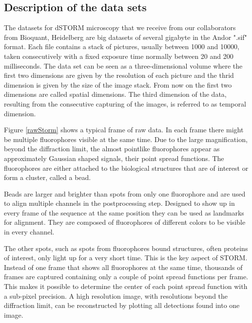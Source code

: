 \subsection{Description of the data sets}
The datasets for dSTORM microscopy that we receive from our collaborators from
Bioquant, Heidelberg are big datasets of several gigabyte in the Andor ".sif" format. Each
file contains a stack of pictures, usually between 1000 and 10000, taken
consecutively with a fixed exposure time normally between 20 and 200 milliseconds. The data set can be seen as a three-dimensional volume where the first two dimensions are given by the resolution of each picture and the thrid dimension is given by the size of the image stack. From now on the first two dimensions are called spatial dimensions. The third dimension of the data, resulting from the consecutive capturing of the images, is referred to as temporal dimension.\newline

Figure \ref{rawStorm} shows a typical frame of raw data. In each frame there might be multiple fluorophores visible at the same time. Due to the large magnification, beyond the diffraction limit, the almost pointlike fluorophores appear as approximately Gaussian shaped signals, their point spread functions. The fluorophores are either attached to the biological structures that are of interest or form a cluster, called a bead.\newline

Beads are larger and brighter than spots from only one fluorophore and are used to align multiple channels in the postprocessing step. Designed to show up in every frame of the sequence at the same position they can be used as landmarks for alignment. They are composed of fluorophores of different colors to be visible in every channel.\newline

The other spots, such as spots from fluorophores bound structures, often proteins of interest, only light up for a very short time. This is the key aspect of STORM. Instead of one frame that shows all fluorophores at the same time, thousands of frames are captured containing only a couple of point spread functions per frame. This makes it possible to determine the center of each point spread function with a sub-pixel precision. A high resolution image, with resolutions beyond the diffraction limit, can be reconstructed by plotting all detections found into one image.

